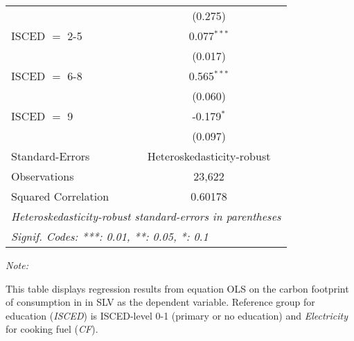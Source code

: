 \begin{table}[htbp!]
\begin{adjustbox}{width = 1\textwidth, max height = 0.95\textheight, center}
\begin{threeparttable}[b]
\begin{tabular}{lc}
                                & (0.275)\\   
            ISCED $=$ 2-5       & 0.077$^{***}$\\   
                                & (0.017)\\   
            ISCED $=$ 6-8       & 0.565$^{***}$\\   
                                & (0.060)\\   
            ISCED $=$ 9         & -0.179$^{*}$\\   
                                & (0.097)\\   
            \midrule 
            Standard-Errors     & Heteroskedasticity-robust \\   
            Observations        & 23,622\\  
            Squared Correlation & 0.60178\\  
            \midrule \midrule
            \multicolumn{2}{l}{\emph{Heteroskedasticity-robust standard-errors in parentheses}}\\
            \multicolumn{2}{l}{\emph{Signif. Codes: ***: 0.01, **: 0.05, *: 0.1}}\\
         \end{tabular}
         
         \begin{tablenotes}\item \medskip \textit{Note:}
            \item This table displays regression results from equation OLS on the carbon footprint of consumption in  in SLV as the dependent variable.  Reference group for education (\textit{ISCED}) is ISCED-level 0-1 (primary or no education) and \textit{Electricity} for cooking fuel (\textit{CF}).
         \end{tablenotes}
      \end{threeparttable}
   \end{adjustbox}
\end{table}


